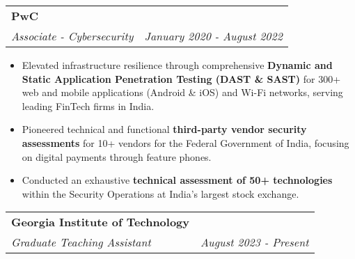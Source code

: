 \documentclass[letterpaper,11pt]{article}
\makeatletter
\newcommand{\resumeItem}[1]{
  \item\small{
    {#1 \vspace{-2pt}}
  }
}
\newcommand{\resumeSubheading}[4]{
  \vspace{-2pt}\item
    \begin{tabular*}{0.97\textwidth}[t]{l@{\extracolsep{\fill}}r}
      \textbf{#1} & #2 \\
      \textit{\small#3} & \textit{\small #4} \\
    \end{tabular*}\vspace{0pt}
}
\newcommand{\resumeItemListStart}{\begin{itemize}}
\newcommand{\resumeItemListEnd}{\end{itemize}\vspace{-5pt}}
\makeatother
\begin{document}
  \resumeSubheading
      {PwC}{}
      {Associate - Cybersecurity}{January 2020 - August 2022}
      \resumeItemListStart
        \resumeItem{}
          {Elevated infrastructure resilience through comprehensive \textbf{Dynamic and Static Application Penetration Testing (DAST \& SAST)} for 300+ web and mobile applications (Android \& iOS) and Wi-Fi networks, serving leading FinTech firms in India.}
       \resumeItem{}
       {Pioneered technical and functional \textbf{third-party vendor security assessments} for 10+ vendors for the Federal Government of India, focusing on digital payments through feature phones.  }
        \resumeItem{}
        {Conducted an exhaustive \textbf{technical assessment of 50+ technologies} within the Security Operations at India’s largest stock exchange.}
        
      \resumeItemListEnd
  

  

    \resumeSubheading
      {Georgia Institute of Technology}{}
    {Graduate Teaching Assistant} {August 2023 - Present}
\end{document}
